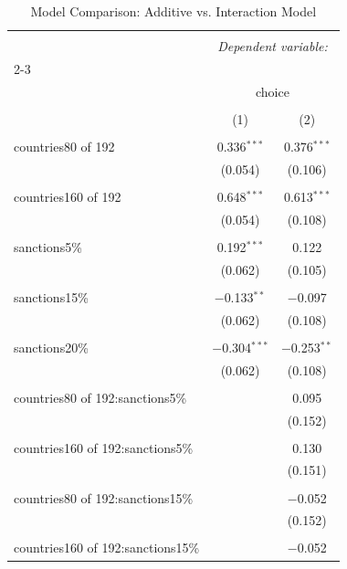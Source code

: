 \documentclass[12pt,letterpaper]{article}
\begin{document}
\begin{enumerate}
	\begin{table}[!htbp] \centering
		\caption{Model Comparison: Additive vs. Interaction Model}
		\label{tab:model_comparison}
		\small
		\begin{tabular}{@{\extracolsep{5pt}}lcc}
			\\[-1.8ex]\hline
			\hline \\[-1.8ex]
			& \multicolumn{2}{c}{\textit{Dependent variable:}} \\
			\cline{2-3}
			\\[-1.8ex] & \multicolumn{2}{c}{choice} \\
			\\[-1.8ex] & (1) & (2)\\
			\hline \\[-1.8ex]
			countries80 of 192 & 0.336$^{***}$ & 0.376$^{***}$ \\
			& (0.054) & (0.106) \\
			& & \\
			countries160 of 192 & 0.648$^{***}$ & 0.613$^{***}$ \\
			& (0.054) & (0.108) \\
			& & \\
			sanctions5\% & 0.192$^{***}$ & 0.122 \\
			& (0.062) & (0.105) \\
			& & \\
			sanctions15\% & $-$0.133$^{**}$ & $-$0.097 \\
			& (0.062) & (0.108) \\
			& & \\
			sanctions20\% & $-$0.304$^{***}$ & $-$0.253$^{**}$ \\
			& (0.062) & (0.108) \\
			& & \\
			countries80 of 192:sanctions5\% &  & 0.095 \\
			&  & (0.152) \\
			& & \\
			countries160 of 192:sanctions5\% &  & 0.130 \\
			&  & (0.151) \\
			& & \\
			countries80 of 192:sanctions15\% &  & $-$0.052 \\
			&  & (0.152) \\
			& & \\
			countries160 of 192:sanctions15\% &  & $-$0.052 \\

\end{tabular}
\end{table}
\end{enumerate}
\end{document}
